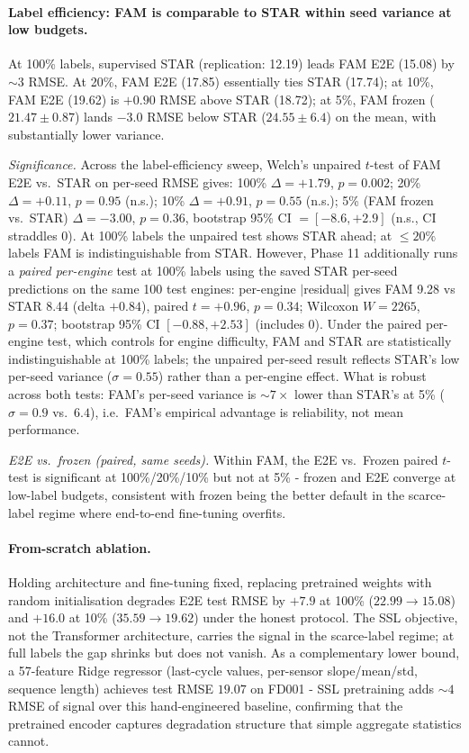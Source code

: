 \documentclass{article}
\begin{document}
\paragraph{Label efficiency: FAM is comparable to STAR within seed variance at low budgets.}
\label{sec:label_efficiency}
At 100\% labels, supervised STAR (replication: 12.19) leads FAM E2E (15.08) by $\sim$3 RMSE. At 20\%, FAM E2E (17.85) essentially ties STAR (17.74); at 10\%, FAM E2E (19.62) is $+0.90$ RMSE above STAR (18.72); at 5\%, FAM frozen ($21.47 \pm 0.87$) lands $-3.0$ RMSE below STAR ($24.55 \pm 6.4$) on the mean, with substantially lower variance.

\emph{Significance.} Across the label-efficiency sweep, Welch's unpaired $t$-test of FAM E2E vs.\ STAR on per-seed RMSE gives: 100\% $\Delta = +1.79$, $p = 0.002$; 20\% $\Delta = +0.11$, $p = 0.95$ (n.s.); 10\% $\Delta = +0.91$, $p = 0.55$ (n.s.); 5\% (FAM frozen vs.\ STAR) $\Delta = -3.00$, $p = 0.36$, bootstrap 95\% CI $= [-8.6, +2.9]$ (n.s., CI straddles 0). At 100\% labels the unpaired test shows STAR ahead; at $\leq 20\%$ labels FAM is indistinguishable from STAR. However, Phase 11 additionally runs a \emph{paired per-engine} test at 100\% labels using the saved STAR per-seed predictions on the same 100 test engines: per-engine $|$residual$|$ gives FAM 9.28 vs STAR 8.44 (delta $+0.84$), paired $t = +0.96$, $p = 0.34$; Wilcoxon $W=2265$, $p=0.37$; bootstrap 95\% CI $[-0.88, +2.53]$ (includes 0). Under the paired per-engine test, which controls for engine difficulty, FAM and STAR are statistically indistinguishable at 100\% labels; the unpaired per-seed result reflects STAR's low per-seed variance ($\sigma = 0.55$) rather than a per-engine effect. What is robust across both tests: FAM's per-seed variance is $\sim 7\times$ lower than STAR's at 5\% ($\sigma = 0.9$ vs.\ $6.4$), i.e.\ FAM's empirical advantage is reliability, not mean performance.

\emph{E2E vs.\ frozen (paired, same seeds).} Within FAM, the E2E vs.\ Frozen paired $t$-test is significant at 100\%/20\%/10\% but not at 5\% - frozen and E2E converge at low-label budgets, consistent with frozen being the better default in the scarce-label regime where end-to-end fine-tuning overfits.

\paragraph{From-scratch ablation.}
\label{sec:from_scratch}
Holding architecture and fine-tuning fixed, replacing pretrained weights with random initialisation degrades E2E test RMSE by $+7.9$ at 100\% ($22.99 \to 15.08$) and $+16.0$ at 10\% ($35.59 \to 19.62$) under the honest protocol. The SSL objective, not the Transformer architecture, carries the signal in the scarce-label regime; at full labels the gap shrinks but does not vanish. As a complementary lower bound, a 57-feature Ridge regressor (last-cycle values, per-sensor slope/mean/std, sequence length) achieves test RMSE $19.07$ on FD001 - SSL pretraining adds $\sim 4$ RMSE of signal over this hand-engineered baseline, confirming that the pretrained encoder captures degradation structure that simple aggregate statistics cannot.
\end{document}

